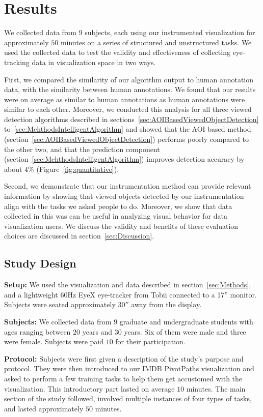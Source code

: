 \section{Results}
\label{sec:Evaluation}
We collected data from $9$ subjects, each using our instrumented visualization for approximately $50$ minutes on a series of structured and unstructured tasks. We used the collected data to test the validity and effectiveness of collecting eye-tracking data in visualization space in two ways. 

First, we compared the similarity of our algorithm output to human annotation data, with the similarity between human annotations. We found that our results were on average as similar to human annotations as human annotations were similar to each other. Moreover, we conducted this analysis for all three viewed detection algorithms described in sections~\ref{sec:AOIBasedViewedObjectDetection} to~\ref{sec:MehthodsIntelligentAlgorithm} and showed that the AOI based method (section~\ref{sec:AOIBasedViewedObjectDetection}) performs poorly compared to the other two, and that the prediction component (section~\ref{sec:MehthodsIntelligentAlgorithm}) improves detection accuracy by about $4\%$  (Figure~\ref{fig:quantitative}). 

Second, we demonstrate that our instrumentation method can provide relevant information by showing that viewed objects detected by our instrumentation align with the tasks we asked people to do. Moreover, we show that data collected in this was can be useful in analyzing visual behavior for data visualization users.  
We discuss the validity and benefits of these evaluation choices are discussed in section~\ref{sec:Discussion}.

\subsection{Study Design }
\label{sec:EvalStudyDesign}

\textbf{Setup: } We used the visualization and data described in section~\ref{sec:Methods}, and a lightweight $60$Hz EyeX eye-tracker from Tobii connected to a 17'' monitor. Subjects were seated approximately $30''$ away from the display. 

\textbf{Subjects:} We collected data from $9$ graduate and undergraduate students with ages ranging between $20$ years and $30$ years. Six of them were male and three were female. Subjects were paid $10$ for their participation. 

\textbf{Protocol:} Subjects were first given a description of the study's purpose and protocol. They were then introduced to our IMDB PivotPaths visualization and asked to perform a few training tasks to help them get accustomed with the visualization. This introductory part lasted on average $10$ minutes. The main section of the study followed, involved multiple instances of four types of tasks, and lasted approximately $50$ minutes. 


